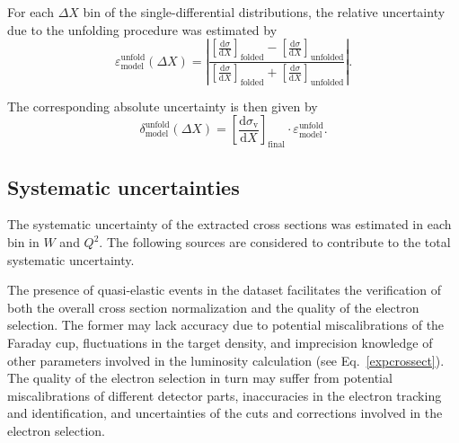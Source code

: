 \documentclass[prc,twocolumn,superscriptaddress,showpacs,amssymb,amsmath,amsfonts,aps,nofootinbib]{revtex4-1}
\begin{document}
For each $\Delta X$ bin of the single-differential distributions, the relative uncertainty due to the unfolding procedure was estimated by
\begin{equation}
\varepsilon^{\text{unfold}}_{\text{model}} (\Delta X) = \left |\dfrac{\left [ \frac{\textrm{d}\sigma}{\textrm{d}X} \right ]_{\text{folded}} - \left [ \frac{\textrm{d}\sigma}{\textrm{d}X} \right ]_{\text{unfolded}}}{\left [ \frac{\textrm{d}\sigma}{\textrm{d}X} \right ]_{\text{folded}} + \left [ \frac{\textrm{d}\sigma}{\textrm{d}X} \right ]_{\text{unfolded}}} \right |.
\label{eq:rel_mod_err_fermi}
\end{equation}

The corresponding absolute uncertainty is then given by
\begin{equation}
\delta^{\text{unfold}}_{\text{model}} (\Delta X) = \left [ \frac{\textrm{d}\sigma_{\text{v}}}{\textrm{d}X} \right ]_{\text{final}}\!\! \cdot \varepsilon^{\text{unfold}}_{\text{model}}.
\label{eq:error_stat_mod_fermi}
\end{equation}




\subsection{Systematic uncertainties}
\label{Sect:sys_uncert}

The systematic uncertainty of the extracted cross sections was estimated in each bin in $W$ and $Q^{2}$. The following sources are considered to contribute to the total systematic uncertainty.


The presence of quasi-elastic events in the dataset facilitates the verification of both the overall cross section normalization and the quality of the electron selection. The former may lack accuracy due to potential miscalibrations of the Faraday cup, fluctuations in the target density, and imprecision knowledge of other parameters involved in the luminosity calculation (see Eq.\!~\eqref{expcrossect}). The quality of the electron selection in turn may suffer from potential miscalibrations of different detector parts, inaccuracies in the electron tracking and identification, and uncertainties of the cuts and corrections involved in the electron selection.
\end{document}
